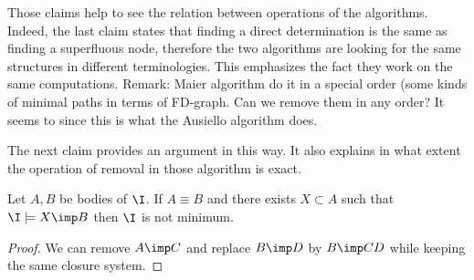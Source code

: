 Those claims help to see the relation between operations of the algorithms. 
Indeed, the last claim states that finding a direct determination is the same
as finding a superfluous node, therefore the two algorithms are looking for
the same structures in different terminologies. This emphasizes the fact they
work on the same computations. Remark: Maier algorithm do it in a special 
order (some kinds of minimal paths in terms of FD-graph. Can we remove them in 
any order? It seems to since this is what the Ausiello algorithm does.

\vspace{1.2em}

The next claim provides an argument in this way. It also explains in what 
extent the operation of removal in those algorithm is exact.

\begin{claim} Let $A, B$ be bodies of $\I$. If $A \equiv B$ and
	there exists $X \subset A$ such that $\I \models X \imp B$ then $\I$ is not
	minimum.
	
\end{claim}

\begin{proof} We can remove $A \imp C$ and replace $B \imp D$ by $B \imp CD$
	while keeping the same closure system.	
\end{proof}

